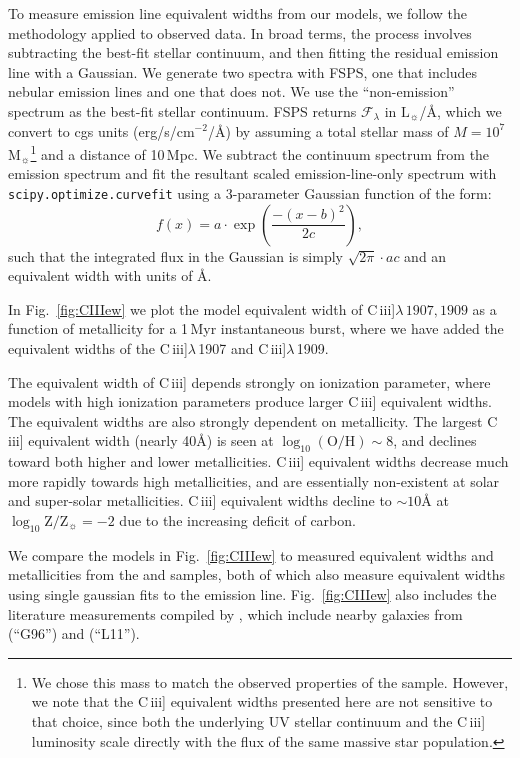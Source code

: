 \documentclass[preprint2]{aastex61}
\newcommand{\FSPS}{{\sc FSPS}\xspace}
\newcommand{\ciii}{C\,{\sc iii}]\xspace}
\newcommand\Lsun{\ensuremath{\mathrm{L_{\sun}}}\xspace}
\newcommand\Msun{\ensuremath{\mathrm{M_{\sun}}}\xspace}
\newcommand{\Myr}{$\,$Myr\xspace}
\newcommand{\logten}{\ensuremath{\log_{10}}}
\newcommand{\logZeq}[1]{\ensuremath{\logten \mathrm{Z}/\mathrm{Z}_{\sun} = #1}}
\newcommand{\ang}{\ensuremath{\mbox{\AA}}\xspace}
\begin{document}
To measure emission line equivalent widths from our models, we follow the methodology applied to observed data. In broad terms, the process involves subtracting the best-fit stellar continuum, and then fitting the residual emission line with a Gaussian. We generate two spectra with \FSPS, one that includes nebular emission lines and one that does not. We use the ``non-emission'' spectrum as the best-fit stellar continuum. \FSPS returns $\mathcal{F}_{\lambda}$ in \Lsun/\ang, which we convert to cgs units (erg/s/cm$^{-2}$/\ang) by assuming a total stellar mass of $M=10^7$\Msun\footnote{We chose this mass to match the observed properties of the \citet{Berg+2016} sample. However, we note that the \ciii equivalent widths presented here are not sensitive to that choice, since both the underlying UV stellar continuum and the \ciii luminosity scale directly with the flux of the same massive star population.} and a distance of 10$\,$Mpc. We subtract the continuum spectrum from the emission spectrum and fit the resultant scaled emission-line-only spectrum with \texttt{scipy.optimize.curvefit} \citep{SciPy} using a 3-parameter Gaussian function of the form:
\begin{equation}
    f(x) = a \cdot \exp \left( \frac{-(x-b)^2}{2c} \right),
\end{equation}
such that the integrated flux in the Gaussian is simply $\sqrt{2\pi} \cdot ac$ and an equivalent width with units of \ang. 

In Fig.~\ref{fig:CIIIew} we plot the model equivalent width of \ciii$\lambda\,1907,1909$ as a function of metallicity for a 1\Myr instantaneous burst, where we have added the equivalent widths of the \ciii$\lambda\,$1907 and \ciii$\lambda\,$1909.

The equivalent width of \ciii depends strongly on ionization parameter, where models with high ionization parameters produce larger \ciii equivalent widths. The equivalent widths are also strongly dependent on metallicity. The largest \ciii equivalent width (nearly 40\ang) is seen  at $\log_{10}(\mathrm{O}/\mathrm{H})\sim 8$, and declines toward both higher and lower metallicities. \ciii equivalent widths decrease much more rapidly towards high metallicities, and are essentially non-existent at solar and super-solar metallicities. \ciii equivalent widths decline to $\sim10$\ang at \logZeq{-2} due to the increasing deficit of carbon.

We compare the models in Fig.~\ref{fig:CIIIew} to measured equivalent widths and metallicities from the \citet{Berg+2016} and \citet{Senchyna+2017} samples, both of which also measure equivalent widths using single gaussian fits to the emission line. Fig.~\ref{fig:CIIIew} also includes the literature measurements compiled by \citet{Senchyna+2017}, which include nearby galaxies from \citet{Giavalisco+1996} (``G96'') and \citet{Leitherer+2011} (``L11'').
\end{document}
